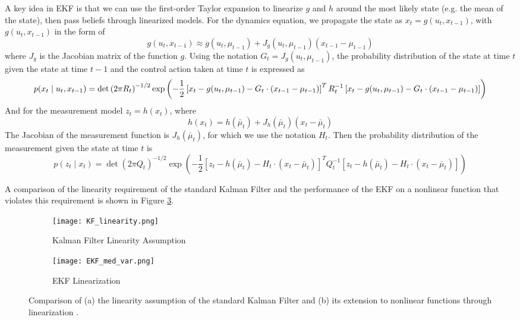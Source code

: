 \documentclass[twoside]{article}
\begin{document}
\par
A key idea in EKF is that we can use the first-order Taylor expansion to linearize $g$ and $h$ around the most likely state (e.g. the mean of the state), then pass beliefs through linearized models. For the dynamics equation, we propagate the state as $x_t = g(u_t, x_{t-1})$, with $g(u_t, x_{t-1})$ in the form of
\begin{equation}
	g(u_t, x_{t-1}) \approx g(u_t, \mu_{t-1}) + J_g(u_t, \mu_{t-1})(x_{t-1}-\mu_{t-1})
\end{equation}
where $J_g$ is the Jacobian matrix of the function $g$. Using the notation $G_t = J_g(u_t, \mu_{t-1})$, the probability distribution of the state at time $t$ given the state at time $t-1$ and the control action taken at time $t$ is expressed as
\begin{equation}\footnotesize
p(x_t \mid u_t, x_{t-1}) = \det \left(2\pi R_t\right)^{-1/2} \exp \left(-\frac{1}{2}\left[x_t - g(u_t, \mu_{t-1}) - G_t\cdot (x_{t-1} - \mu_{t-1})\right]^T R_t^{-1} \left[x_t - g(u_t, \mu_{t-1}) - G_t\cdot(x_{t-1} - \mu_{t-1})\right]\right)
\end{equation}
And for the measurement model $z_t = h(x_t)$, where
\begin{equation}
	h(x_t) = h(\bar{\mu}_{t})+J_h(\bar{\mu}_{t})(x_t-\bar{\mu}_{t})
\end{equation}
The Jacobian of the measurement function is $J_h({\bar{\mu}_t})$, for which we use the notation $H_t$. Then the probability distribution of the measurement given the state at time $t$ is
\begin{equation}
p(z_t \mid x_t) = \det(2\pi Q_t)^{-1/2} \exp \left( -\frac{1}{2} \left[z_t - h(\bar{\mu}_t) - H_t \cdot (x_t - \bar{\mu}_t)\right]^T Q_t^{-1}\left[z_t - h(\bar{\mu}_t) - H_t \cdot (x_t - \bar{\mu}_t)\right]\right)
\end{equation}

A comparison of the linearity requirement of the standard Kalman Filter and the performance of the EKF on a nonlinear function that violates this requirement is shown in Figure \ref{fig:KF_vs_EKF}.

\begin{figure}[tp]
\centering
\begin{subfigure}{.5\textwidth}
  \centering
  \texttt{[image: KF\_linearity.png]}
  \caption{Kalman Filter Linearity Assumption}
  \label{fig:KF_linearity}
\end{subfigure}%
\begin{subfigure}{.5\textwidth}
  \centering
  \texttt{[image: EKF\_med\_var.png]}
  \caption{EKF Linearization}
  \label{fig:EKF_med_var}
\end{subfigure}
\caption{Comparison of (a) the linearity assumption of the standard Kalman Filter \cite{Xmisc} and (b) its extension to nonlinear functions through linearization \cite{Xmisc}.}
\label{fig:KF_vs_EKF}
\end{figure}
\end{document}
